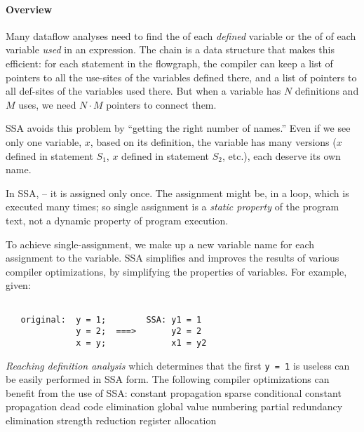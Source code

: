 \documentclass{memo}
\begin{document}
\small
{}


\paragraph{Overview} 
Many dataflow analyses need to find the  of each {\em defined\/}
variable or the  of of each variable {\em used\/} in an
expression. The  chain is a data structure that makes this
efficient: for each statement in the flowgraph, the compiler can keep a list
of pointers to all the use-sites of the variables defined there,  and a list
of pointers to all def-sites of the variables used there.  But when a variable
has $N$ definitions and $M$ uses, we need $N\cdot{}M$ pointers to connect
them. 

SSA avoids this problem by ``getting the right number of names.'' Even if we
see only one variable, $x$, based on its definition, the variable has many
versions ($x$ defined in statement $S_1$, $x$ defined in statement $S_2$,
etc.), each deserve its own name. 

In SSA,  -- it is
assigned only once. The assignment might be, in a loop, which is executed many
times; so single assignment is a {\em static property\/} of the program text,
not a dynamic property of program execution.

To achieve single-assignment, we make up a new variable name for each
assignment to the variable. SSA simplifies and improves the results of various
compiler optimizations, by simplifying the properties of variables. For
example, given:
\begin{verbatim}

   original:  y = 1;        SSA: y1 = 1
              y = 2;  ===>       y2 = 2
              x = y;             x1 = y2
\end{verbatim}

{\em Reaching definition analysis\/} which determines that the first
\verb+y = 1+ is useless can be easily performed in SSA form. The following
compiler optimizations can benefit from the use of SSA:
\bit
\w constant propagation
\w sparse conditional constant propagation
\w dead code elimination
\w global value numbering
\w partial redundancy elimination
\w strength reduction
\w register allocation
\eit


\end{document}
